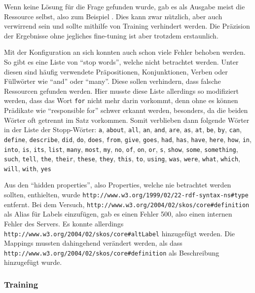 Wenn keine Lösung für die Frage gefunden wurde, gab es als Ausgabe meist die Ressource selbst, also zum Beispiel .
Dies kann zwar nützlich, aber auch verwirrend sein und sollte mithilfe von Training verhindert werden.
Die Präzision der Ergebnisse ohne jegliches fine-tuning ist aber trotzdem erstaunlich.

Mit der Konfiguration an sich konnten auch schon viele Fehler behoben werden.
So gibt es eine Liste von \enquote{stop words}, welche nicht betrachtet werden.
Unter diesen sind häufig verwendete Präpositionen, Konjunktionen, Verben oder Füllwörter wie \enquote{and} oder \enquote{many}.
Diese sollen verhindern, dass falsche Ressourcen gefunden werden.
Hier musste diese Liste allerdings so modifiziert werden, dass das Wort \texttt{for} nicht mehr darin vorkommt, denn ohne es können Prädikate wie \enquote{responsible for} schwer erkannt werden,
besonders, da die beiden Wörter oft getrennt im Satz vorkommen.
Somit verblieben dann folgende Wörter in der Liste der Stopp-Wörter:
\texttt{a}, \texttt{about}, \texttt{all}, \texttt{an}, \texttt{and}, \texttt{are}, \texttt{as}, \texttt{at}, \texttt{be}, \texttt{by}, \texttt{can}, \texttt{define}, \texttt{describe}, \texttt{did}, \texttt{do}, \texttt{does}, \texttt{from}, \texttt{give}, \texttt{goes}, \texttt{had}, \texttt{has}, \texttt{have}, \texttt{here}, \texttt{how}, \texttt{in}, \texttt{into}, \texttt{is}, \texttt{its}, \texttt{list}, \texttt{many}, \texttt{most}, \texttt{my}, \texttt{no}, \texttt{of}, \texttt{on}, \texttt{or}, \texttt{s}, \texttt{show}, \texttt{some}, \texttt{something}, \texttt{such}, \texttt{tell}, \texttt{the}, \texttt{their}, \texttt{these}, \texttt{they}, \texttt{this}, \texttt{to}, \texttt{using}, \texttt{was}, \texttt{were}, \texttt{what}, \texttt{which}, \texttt{will}, \texttt{with}, \texttt{yes}

Aus den \enquote{hidden properties}, also Properties, welche nie betrachtet werden sollten, enthielten, wurde \texttt{http://www.w3.org/1999/02/22-rdf-syntax-ns\#type} entfernt.
Bei dem Versuch, \texttt{http://www.w3.org/2004/02/skos/core\#definition} als Alias für Labels einzufügen, gab es einen Fehler 500, also einen internen Fehler des Servers.
Es konnte allerdings \texttt{http://www.w3.org/2004/02/skos/core\#altLabel} hinzugefügt werden.
Die Mappings mussten dahingehend verändert werden, als dass \texttt{http://www.w3.org/2004/02/skos/core\#definition} als Beschreibung hinzugefügt wurde.

\subsubsection{Training}
